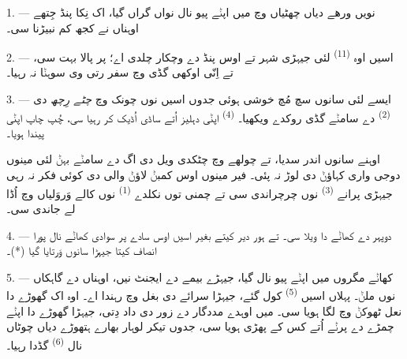 

\VUsaut{4.0mm}
\VUsaut{3.0mm}
\VUfilet{16mm}
\VUsaut{5.6mm}
\VUsaut{3.0mm}

\VUsaut{3.0mm}

\VUsaut{4.0mm}

1. --- نویں ورھے دیاں چھٹیاں وچ میں اپݨے پیو نال نواں گراں گیا، اک نِکا پنڈ
جِتھے اوہناں نے کجھ کم نبیڑنا سی۔

2. --- اسیں اوہ  \textsuperscript{(11)} لئی جیہڑی شہر تے اوس پنڈ
دے وچکار چلدی اے؛ پر پالا بہت سی، تے اِنّی اوکھی گڈی وچ سفر رتی وی سوہݨا نہ
رہیا۔

3. --- ایسے لئی سانوں سچ مُچ خوشی ہوئی جدوں اسیں  نوں چونک وچ
\textit{چٹے رِچھ} دی  \textsuperscript{(2)} دے سامݨے گڈی روکدے
ویکھیا۔  \textsuperscript{(4)} اپݨی دہلیز اُتے ساڈی اُڈیک کر
رہیا سی، چُپ چاپ اپݨی  پیندا ہویا۔

اوہنے سانوں اندر سدیا، تے چولھے وچ چٹکدی ویل دی اگ دے سامݨے بہݨ لئی مینوں دوجی
واری کہاؤݨ دی لوڑ نہ پئی۔ فیر مینوں اوس کمبݨ لاؤݨ والی  دی
کوئی فکر نہ رہی جیہڑی پرانے  \textsuperscript{(3)} نوں چرچراندی سی تے
چمنی توں نکلدے  \textsuperscript{(1)} نوں کالے وَروَلیاں وچ اُڈا لے
جاندی سی۔

4. --- دوپہر دے کھاݨے دا ویلا سی۔ تے ہور دیر کیتے بغیر اسیں اوس سادے پر سوادی
کھاݨے نال پورا انصاف کیتا جیہڑا سانوں وَرتایا گیا (*)۔

\VUsaut{3.0mm}

5. --- کھاݨے مگروں میں اپݨے پیو نال گیا، جیہڑے بیمے دے ایجنٹ نیں، اوہناں دے
گاہکاں نوں ملݨ۔ پہلاں اسیں  \textsuperscript{(5)} کول گئے، جیہڑا
سرائے دی بغل وچ رہندا اے۔ اوہ اک گھوڑے دا نعل ٹھوکݨ وچ لگا ہویا سی۔ میں اوہدے
مددگار دے زور دی داد دِتی، جیہڑا گھوڑے دا  اپݨے چمڑے دے پرݨے اُتے
کس کے پھڑی ہویا سی، جدوں تیکر لوہار بھارے ہتھوڑے دیاں چوٹاں نال 
\textsuperscript{(6)} گڈدا رہیا۔

